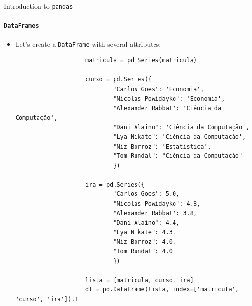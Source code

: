 \documentclass[notes,11pt, aspectratio=169, xcolor=table]{beamer}
\begin{document}
        \begin{frame}[fragile=singleslide]{Introduction to \texttt{pandas}}
        \framesubtitle{\texttt{DataFrames}}
            
             \begin{itemize}
    
                \item Let’s create a \texttt{DataFrame} with several attributes:

                    \begin{verbatim}
                    matricula = pd.Series(matricula)
                    
                    curso = pd.Series({
                            'Carlos Goes': 'Economia',
                            "Nicolas Powidayko": 'Economia',
                            "Alexander Rabbat": 'Ciência da Computação',
                            "Dani Alaino": 'Ciência da Computação',
                            "Lya Nikate": 'Ciência da Computação',
                            "Niz Borroz": 'Estatística',
                            "Tom Rundal": "Ciência da Computação"
                            })

                    ira = pd.Series({
                            'Carlos Goes': 5.0,
                            "Nicolas Powidayko": 4.8,
                            "Alexander Rabbat": 3.8,
                            "Dani Alaino": 4.4,
                            "Lya Nikate": 4.3,
                            "Niz Borroz": 4.0,
                            "Tom Rundal": 4.0
                            })

                    lista = [matricula, curso, ira]
                    df = pd.DataFrame(lista, index=['matricula', 'curso', 'ira']).T
                    \end{verbatim}
        
            \end{itemize}             

        \end{frame}    
\end{document}
